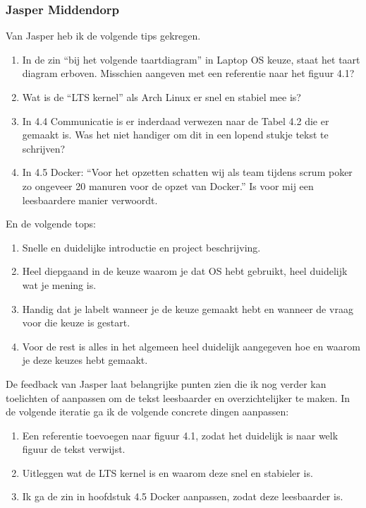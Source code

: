 \documentclass[a4paper]{report}
\begin{document}
\subsubsection{Jasper Middendorp}
Van Jasper heb ik de volgende tips gekregen.
\begin{enumerate}
  \item In de zin “bij het volgende taartdiagram” in Laptop OS keuze, staat het taart diagram erboven. Misschien aangeven met een referentie naar het figuur 4.1?
  \item Wat is de “LTS kernel” als Arch Linux er snel en stabiel mee is?
  \item In 4.4 Communicatie is er inderdaad verwezen naar de Tabel 4.2 die er gemaakt is. Was het niet handiger om dit in een lopend stukje tekst te schrijven?
  \item In 4.5 Docker: “Voor het opzetten schatten wij als team tijdens scrum poker zo ongeveer 20 manuren voor de opzet van Docker.” Is voor mij een leesbaardere manier verwoordt.
\end{enumerate}
En de volgende tops:
\begin{enumerate}
  \item Snelle en duidelijke introductie en project beschrijving.
  \item Heel diepgaand in de keuze waarom je dat OS hebt gebruikt, heel duidelijk wat je mening is.
  \item Handig dat je labelt wanneer je de keuze gemaakt hebt en wanneer de vraag voor die keuze is gestart.
  \item Voor de rest is alles in het algemeen heel duidelijk aangegeven hoe en waarom je deze keuzes hebt gemaakt.
\end{enumerate}

De feedback van Jasper laat belangrijke punten zien die ik nog verder kan toelichten of aanpassen om de tekst leesbaarder en overzichtelijker te maken.
In de volgende iteratie ga ik de volgende concrete dingen aanpassen: 
\begin{enumerate}
  \item Een referentie toevoegen naar figuur 4.1, zodat het duidelijk is naar welk figuur de tekst verwijst.
  \item Uitleggen wat de LTS kernel is en waarom deze snel en stabieler is. 
  \item Ik ga de zin in hoofdstuk 4.5 Docker aanpassen, zodat deze leesbaarder is. 
\end{enumerate}
\end{document}
